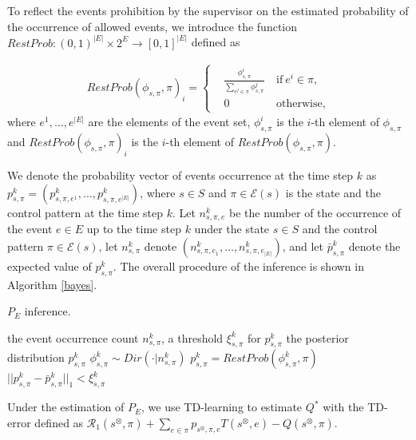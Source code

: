 \documentclass[letterpaper, 10 pt, conference, dvipdfmx]{ieeeconf}
\begin{document}
To reflect the events prohibition by the supervisor on the estimated probability of the occurrence of allowed events, we introduce the function $RestProb : (0,1)^{|E|} \times 2^E \rightarrow [0,1]^{|E|}$ defined as

\begin{align}
  RestProb(\phi_{s,\pi},\pi)_i =
  \left\{
  \begin{aligned}
    & \frac{\phi^i_{s,\pi}}{\sum_{e^j \in \pi} \phi^j_{s,\pi}} \  &\text{if}\ e^i \in \pi,\\
    &0   \ &\text{otherwise},
  \end{aligned}
  \right.
\end{align}
where $e^1, \ldots, e^{|E|}$ are the elements of the event set, $\phi^i_{s,\pi}$ is the $i$-th element of $\phi_{s,\pi}$ and $RestProb(\phi_{s,\pi},\pi)_i$ is the $i$-th element of $RestProb(\phi_{s,\pi},\pi)$.

We denote the probability vector of events occurrence at the time step $k$ as $p^k_{s,\pi} = (p^k_{s,\pi,e^1}, \ldots, p^k_{s,\pi,e^{|E|}})$, where $s \in S$ and $\pi \in \mathcal{E}(s)$ is the state and the control pattern at the time step $k$. Let $n^k_{s,\pi,e}$ be the number of the occurrence of the event $e \in E$ up to the time step $k$ under the state $s \in S$ and the control pattern $\pi \in \mathcal{E}(s)$, let $n^k_{s,\pi}$ denote $(n^k_{s,\pi,e_1}, \ldots, n^k_{s,\pi,e_{|E|}})$, and let $\bar{p}^k_{s,\pi}$ denote the expected value of $p^k_{s,\pi}$. The overall procedure of the inference is shown in Algorithm \ref{bayes}.

\begin{algorithm}
 \caption{$P_E$ inference.}
 \begin{algorithmic}[1]
 \renewcommand{\algorithmicrequire}{\textbf{Input:}}
 \renewcommand{\algorithmicensure}{\textbf{Output:}}
 \REQUIRE the event occurrence count $n^k_{s,\pi}$, a threshold $\xi^k_{s,\pi}$ for $p^k_{s,\pi}$
 \ENSURE  the posterior distribution $p^k_{s,\pi}$
  \REPEAT
  \STATE $\phi^k_{s,\pi} \sim Dir(\cdot|n^k_{s,\pi})$
  \STATE $p^k_{s,\pi} = RestProb(\phi^k_{s,\pi},\pi)$
  \UNTIL $||p^k_{s,\pi} - \bar{p}^k_{s,\pi}||_1 < \xi^k_{s,\pi}$
 \end{algorithmic}
 \label{bayes}
 \end{algorithm}

Under the estimation of $P_E$, we use TD-learning to estimate $Q^{\ast}$ with the TD-error defined as $\mathcal{R}_1(s^{\otimes},\pi) + \sum_{e \in \pi} p_{s^{\otimes},\pi,e} T(s^{\otimes},e) - Q(s^{\otimes},\pi)$.
\end{document}
